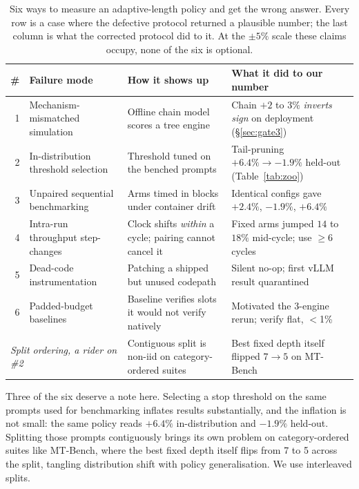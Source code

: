 \documentclass[conference]{IEEEtran}
\begin{document}
\begin{table}[t]
\caption{Six ways to measure an adaptive-length policy and get the wrong answer. Every row is
a case where the defective protocol returned a plausible number; the last column is what the
corrected protocol did to it. At the $\pm5\%$ scale these claims occupy, none of the six is
optional.}
\label{tab:failuremodes}
\centering
\footnotesize
\setlength{\tabcolsep}{4pt}
\begin{tabular}{rlll}
\toprule
\# & Failure mode & How it shows up & What it did to our number \\
\midrule
1 & Mechanism-mismatched simulation & Offline chain model scores a tree engine & Chain $+2$ to $3\%$ \emph{inverts sign} on deployment (\S\ref{sec:gate3}) \\
2 & In-distribution threshold selection & Threshold tuned on the benched prompts & Tail-pruning $+6.4\% \rightarrow -1.9\%$ held-out (Table~\ref{tab:zoo}) \\
3 & Unpaired sequential benchmarking & Arms timed in blocks under container drift & Identical configs gave $+2.4\%$, $-1.9\%$, $+6.4\%$ \\
4 & Intra-run throughput step-changes & Clock shifts \emph{within} a cycle; pairing cannot cancel it & Fixed arms jumped $14$ to $18\%$ mid-cycle; use $\geq$6 cycles \\
5 & Dead-code instrumentation & Patching a shipped but unused codepath & Silent no-op; first vLLM result quarantined \\
6 & Padded-budget baselines & Baseline verifies slots it would not verify natively & Motivated the 3-engine rerun; verify flat, $<$1\% \\
\midrule
\multicolumn{2}{l}{\emph{Split ordering, a rider on \#2}} & Contiguous split is non-iid on category-ordered suites & Best fixed depth itself flipped $7\rightarrow5$ on MT-Bench \\
\bottomrule
\end{tabular}
\end{table}

Three of the six deserve a note here. Selecting a stop threshold on the same prompts used for
benchmarking inflates results substantially, and the inflation is not small: the same policy
reads $+6.4\%$ in-distribution and $-1.9\%$ held-out. Splitting those prompts contiguously
brings its own problem on category-ordered suites like MT-Bench, where the best fixed depth
itself flips from 7 to 5 across the split, tangling distribution shift with policy
generalisation. We use interleaved splits.
\end{document}
